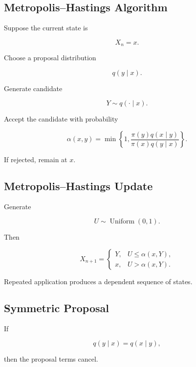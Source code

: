 \subsection{Metropolis--Hastings Algorithm}
\label{subsec:metropolis-hastings}

Suppose the current state is

\[
X_n=x.
\]

Choose a proposal distribution

\[
\boxed{
q(y\mid x).
}
\]

Generate candidate

\[
Y\sim q(\cdot\mid x).
\]

Accept the candidate with probability

\[
\boxed{
\alpha(x,y)
=
\min
\left\{
1,
\frac{
\pi(y)q(x\mid y)
}{
\pi(x)q(y\mid x)
}
\right\}.
}
\]

If rejected, remain at \(x\).

\subsection{Metropolis--Hastings Update}
\label{subsec:metropolis-hastings-update}

Generate

\[
U\sim\operatorname{Uniform}(0,1).
\]

Then

\[
\boxed{
X_{n+1}
=
\begin{cases}
Y,
&
U\leq\alpha(x,Y),
\\
x,
&
U>\alpha(x,Y).
\end{cases}
}
\]

Repeated application produces a dependent sequence of states.

\subsection{Symmetric Proposal}
\label{subsec:symmetric-mh-proposal}

If

\[
q(y\mid x)
=
q(x\mid y),
\]

then the proposal terms cancel.

